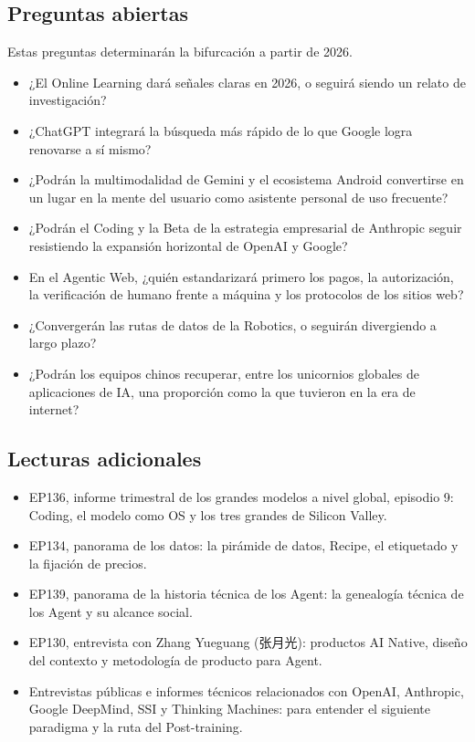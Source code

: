 \subsection{Preguntas abiertas}

Estas preguntas determinarán la bifurcación a partir de 2026.

\begin{itemize}
\item ¿El Online Learning dará señales claras en 2026, o seguirá siendo un relato de investigación?
\item ¿ChatGPT integrará la búsqueda más rápido de lo que Google logra renovarse a sí mismo?
\item ¿Podrán la multimodalidad de Gemini y el ecosistema Android convertirse en un lugar en la mente del usuario como asistente personal de uso frecuente?
\item ¿Podrán el Coding y la Beta de la estrategia empresarial de Anthropic seguir resistiendo la expansión horizontal de OpenAI y Google?
\item En el Agentic Web, ¿quién estandarizará primero los pagos, la autorización, la verificación de humano frente a máquina y los protocolos de los sitios web?
\item ¿Convergerán las rutas de datos de la Robotics, o seguirán divergiendo a largo plazo?
\item ¿Podrán los equipos chinos recuperar, entre los unicornios globales de aplicaciones de IA, una proporción como la que tuvieron en la era de internet?
\end{itemize}

\subsection{Lecturas adicionales}

\begin{itemize}
\item EP136, informe trimestral de los grandes modelos a nivel global, episodio 9: Coding, el modelo como OS y los tres grandes de Silicon Valley.
\item EP134, panorama de los datos: la pirámide de datos, Recipe, el etiquetado y la fijación de precios.
\item EP139, panorama de la historia técnica de los Agent: la genealogía técnica de los Agent y su alcance social.
\item EP130, entrevista con Zhang Yueguang (张月光): productos AI Native, diseño del contexto y metodología de producto para Agent.
\item Entrevistas públicas e informes técnicos relacionados con OpenAI, Anthropic, Google DeepMind, SSI y Thinking Machines: para entender el siguiente paradigma y la ruta del Post-training.
\end{itemize}

